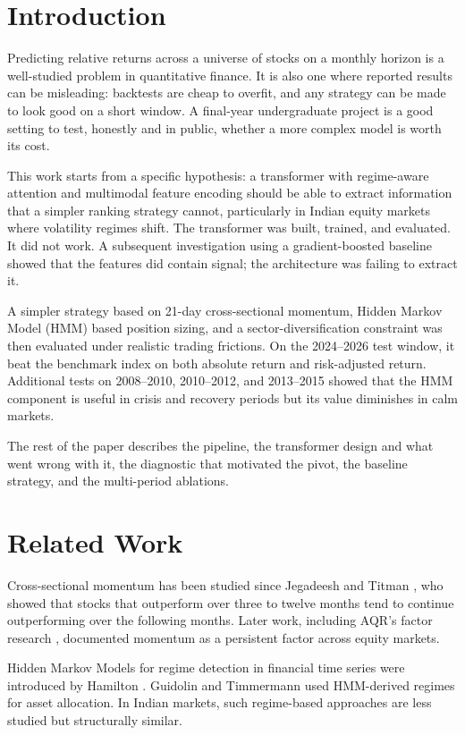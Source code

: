 \documentclass[conference]{IEEEtran}
\begin{document}
\section{Introduction}

Predicting relative returns across a universe of stocks on a monthly horizon is a well-studied problem in quantitative finance. It is also one where reported results can be misleading: backtests are cheap to overfit, and any strategy can be made to look good on a short window. A final-year undergraduate project is a good setting to test, honestly and in public, whether a more complex model is worth its cost.

This work starts from a specific hypothesis: a transformer with regime-aware attention and multimodal feature encoding should be able to extract information that a simpler ranking strategy cannot, particularly in Indian equity markets where volatility regimes shift. The transformer was built, trained, and evaluated. It did not work. A subsequent investigation using a gradient-boosted baseline showed that the features did contain signal; the architecture was failing to extract it.

A simpler strategy based on 21-day cross-sectional momentum, Hidden Markov Model (HMM) based position sizing, and a sector-diversification constraint was then evaluated under realistic trading frictions. On the 2024--2026 test window, it beat the benchmark index on both absolute return and risk-adjusted return. Additional tests on 2008--2010, 2010--2012, and 2013--2015 showed that the HMM component is useful in crisis and recovery periods but its value diminishes in calm markets.

The rest of the paper describes the pipeline, the transformer design and what went wrong with it, the diagnostic that motivated the pivot, the baseline strategy, and the multi-period ablations.

\section{Related Work}

Cross-sectional momentum has been studied since Jegadeesh and Titman \cite{jegadeesh1993}, who showed that stocks that outperform over three to twelve months tend to continue outperforming over the following months. Later work, including AQR's factor research \cite{asness2013}, documented momentum as a persistent factor across equity markets.

Hidden Markov Models for regime detection in financial time series were introduced by Hamilton \cite{hamilton1989}. Guidolin and Timmermann \cite{guidolin2007} used HMM-derived regimes for asset allocation. In Indian markets, such regime-based approaches are less studied but structurally similar.
\end{document}
